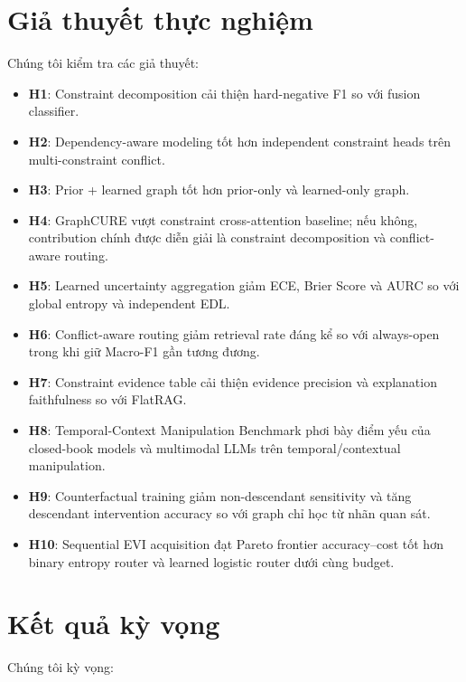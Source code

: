 \documentclass[11pt,a4paper]{article}
\begin{document}
\section{Giả thuyết thực nghiệm}

Chúng tôi kiểm tra các giả thuyết:

\begin{itemize}[leftmargin=1.5em]
\item \textbf{H1}: Constraint decomposition cải thiện hard-negative F1 so với fusion classifier.
\item \textbf{H2}: Dependency-aware modeling tốt hơn independent constraint heads trên multi-constraint conflict.
\item \textbf{H3}: Prior + learned graph tốt hơn prior-only và learned-only graph.
\item \textbf{H4}: GraphCURE vượt constraint cross-attention baseline; nếu không, contribution chính được diễn giải là constraint decomposition và conflict-aware routing.
\item \textbf{H5}: Learned uncertainty aggregation giảm ECE, Brier Score và AURC so với global entropy và independent EDL.
\item \textbf{H6}: Conflict-aware routing giảm retrieval rate đáng kể so với always-open trong khi giữ Macro-F1 gần tương đương.
\item \textbf{H7}: Constraint evidence table cải thiện evidence precision và explanation faithfulness so với FlatRAG.
\item \textbf{H8}: Temporal-Context Manipulation Benchmark phơi bày điểm yếu của closed-book models và multimodal LLMs trên temporal/contextual manipulation.
\item \textbf{H9}: Counterfactual training giảm non-descendant sensitivity và tăng descendant intervention accuracy so với graph chỉ học từ nhãn quan sát.
\item \textbf{H10}: Sequential EVI acquisition đạt Pareto frontier accuracy--cost tốt hơn binary entropy router và learned logistic router dưới cùng budget.
\end{itemize}

\section{Kết quả kỳ vọng}

Chúng tôi kỳ vọng:
\end{document}
